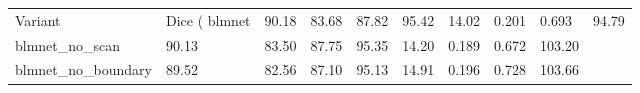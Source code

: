 \begin{tabular}{lllllllll}
\toprule
Variant & Dice (%
\midrule
blmnet & 90.18 & 83.68 & 87.82 & 95.42 & 14.02 & 0.201 & 0.693 & 94.79 \\
blmnet_no_scan & 90.13 & 83.50 & 87.75 & 95.35 & 14.20 & 0.189 & 0.672 & 103.20 \\
blmnet_no_boundary & 89.52 & 82.56 & 87.10 & 95.13 & 14.91 & 0.196 & 0.728 & 103.66 \\
\bottomrule
\end{tabular}
